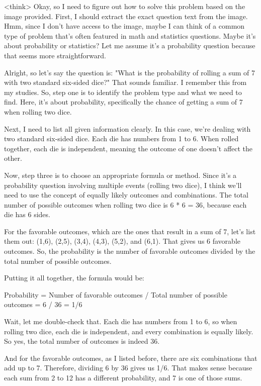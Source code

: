 <think>
Okay, so I need to figure out how to solve this problem based on the image provided. First, I should extract the exact question text from the image. Hmm, since I don't have access to the image, maybe I can think of a common type of problem that's often featured in math and statistics questions. Maybe it's about probability or statistics? Let me assume it's a probability question because that seems more straightforward.

Alright, so let's say the question is: "What is the probability of rolling a sum of 7 with two standard six-sided dice?" That sounds familiar. I remember this from my studies. So, step one is to identify the problem type and what we need to find. Here, it's about probability, specifically the chance of getting a sum of 7 when rolling two dice.

Next, I need to list all given information clearly. In this case, we're dealing with two standard six-sided dice. Each die has numbers from 1 to 6. When rolled together, each die is independent, meaning the outcome of one doesn't affect the other.

Now, step three is to choose an appropriate formula or method. Since it's a probability question involving multiple events (rolling two dice), I think we'll need to use the concept of equally likely outcomes and combinations. The total number of possible outcomes when rolling two dice is 6 * 6 = 36, because each die has 6 sides.

For the favorable outcomes, which are the ones that result in a sum of 7, let's list them out: (1,6), (2,5), (3,4), (4,3), (5,2), and (6,1). That gives us 6 favorable outcomes. So, the probability is the number of favorable outcomes divided by the total number of possible outcomes.

Putting it all together, the formula would be:

Probability = Number of favorable outcomes / Total number of possible outcomes
= 6 / 36
= 1/6

Wait, let me double-check that. Each die has numbers from 1 to 6, so when rolling two dice, each die is independent, and every combination is equally likely. So yes, the total number of outcomes is indeed 36.

And for the favorable outcomes, as I listed before, there are six combinations that add up to 7. Therefore, dividing 6 by 36 gives us 1/6. That makes sense because each sum from 2 to 12 has a different probability, and 7 is one of those sums.

